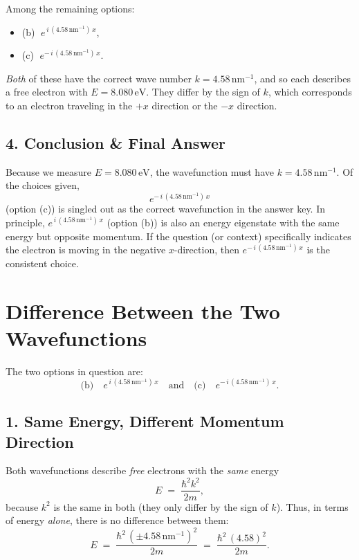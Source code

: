 \documentclass[12pt]{article}
\theoremstyle{definition} %
\theoremstyle{plain} %
\begin{document}
Among the remaining options:
\begin{itemize}
\item (b) $\;e^{\,i\,(4.58\,\mathrm{nm}^{-1})\,x}$,
\item (c) $\;e^{-\,i\,(4.58\,\mathrm{nm}^{-1})\,x}$.
\end{itemize}
\emph{Both} of these have the correct wave number $k=4.58\,\mathrm{nm}^{-1}$, 
and so each describes a free electron with $E=8.080\,\text{eV}$.  
They differ by the sign of $k$, which corresponds to an electron traveling in the $+x$ direction or the $-x$ direction.  

\subsection*{4. Conclusion \& Final Answer}

Because we measure $E=8.080\,\text{eV}$, the wavefunction must have $k=4.58\,\mathrm{nm}^{-1}$.  
Of the choices given, 
\[
\boxed{e^{-\,i\,(4.58\,\mathrm{nm}^{-1})\,x}}
\]
(option (c)) is singled out as the correct wavefunction in the answer key.  
In principle, 
$e^{\,i\,(4.58\,\mathrm{nm}^{-1})\,x}$ (option (b)) is also an energy eigenstate with the same energy but opposite momentum.  
If the question (or context) specifically indicates the electron is moving in the negative $x$-direction, 
then \(\displaystyle e^{-\,i\,(4.58\,\mathrm{nm}^{-1})\,x}\) is the consistent choice.

\section*{Difference Between the Two Wavefunctions}

The two options in question are:
\[
\text{(b)}\quad e^{\,i\,(4.58\,\mathrm{nm}^{-1})\,x}
\quad\text{and}\quad
\text{(c)}\quad e^{-\,i\,(4.58\,\mathrm{nm}^{-1})\,x}.
\]

\subsection*{1. Same Energy, Different Momentum Direction}

Both wavefunctions describe \emph{free} electrons with the \emph{same} energy
\[
E \;=\;\frac{\hbar^2 k^2}{2m},
\]
because $k^2$ is the same in both (they only differ by the sign of $k$). 
Thus, in terms of energy \emph{alone}, there is no difference between them:
\[
E \;=\;\frac{\hbar^2\,(\pm 4.58\,\mathrm{nm}^{-1})^2}{2m}
\;=\;
\frac{\hbar^2\,(4.58)^2}{2m}.
\]
\end{document}
